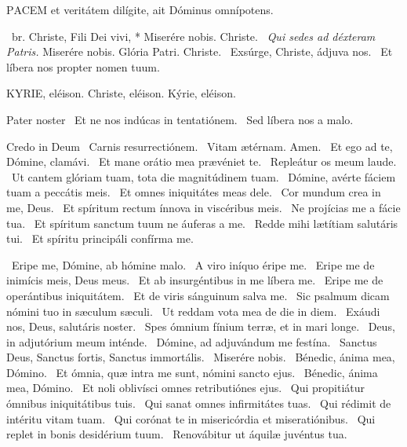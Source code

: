 

\lettrine[lines=2]{P}{ACEM} et veritátem dilígite, ait Dóminus omnípotens.

\R\ br. Christe, Fili Dei vivi, * Miserére nobis. Christe. \V\ \textit{Qui sedes ad déxteram Patris.} Miserére nobis. Glória Patri. Christe. \V\ Exsúrge, Christe, ádjuva nos. \R\ Et líbera nos propter nomen tuum.



KYRIE, eléison. Christe, eléison. Kýrie, eléison.

Pater noster  \V\ Et ne nos indúcas in tentatiónem. \R\ Sed líbera nos a malo.

Credo in Deum  \V\ Carnis resurrectiónem. \R\ Vitam ætérnam. Amen. \V\ Et ego ad te, Dómine, clamávi. \R\ Et mane orátio mea prævéniet te. \V\ Repleátur os meum laude. \R\ Ut cantem glóriam tuam, tota die magnitúdinem tuam. \V\ Dómine, avérte fáciem tuam a peccátis meis. \R\ Et omnes iniquitátes meas dele. \V\ Cor mundum crea in me, Deus. \R\ Et spíritum rectum ínnova in viscéribus meis. \V\ Ne projícias me a fácie tua. \R\ Et spíritum sanctum tuum ne áuferas a me. \V\ Redde mihi lætítiam salutáris tui. \R\ Et spíritu principáli confírma me.


\V\ Eripe me, Dómine, ab hómine malo. \R\ A viro iníquo éripe me. \V\ Eripe me de inimícis meis, Deus meus. \R\ Et ab insurgéntibus in me líbera me. \V\ Eripe me de operántibus iniquitátem. \R\ Et de viris sánguinum salva me. \V\ Sic psalmum dicam nómini tuo in sæculum sæculi. \R\ Ut reddam vota mea de die in diem. \V\ Exáudi nos, Deus, salutáris noster. \R\ Spes ómnium fínium terræ, et in mari longe. \V\ Deus, in adjutórium meum inténde. \R\ Dómine, ad adjuvándum me festína. \V\ Sanctus Deus, Sanctus fortis, Sanctus immortális. \R\ Miserére nobis. \V\ Bénedic, ánima mea, Dómino. \R\ Et ómnia, quæ intra me sunt, nómini sancto ejus. \V\ Bénedic, ánima mea, Dómino. \R\ Et noli oblivísci omnes retributiónes ejus. \V\ Qui propitiátur ómnibus iniquitátibus tuis. \R\ Qui sanat omnes infirmitátes tuas. \V\ Qui rédimit de intéritu vitam tuam. \R\ Qui corónat te in misericórdia et miseratiónibus. \V\ Qui replet in bonis desidérium tuum. \R\ Renovábitur ut áquilæ juvéntus tua.

